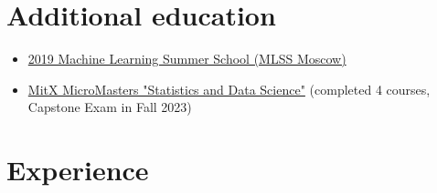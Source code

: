 \documentclass[unicode,a4paper,10pt]{article}
\begin{document}
\section{Additional education}
\begin{itemize}
	\item \href{https://smiles.skoltech.ru/mlss2019}{2019 Machine Learning Summer School (MLSS Moscow)}
	\item \href{https://courses.edx.org/dashboard/programs/fa06b9c5-fe2b-41d8-a8c1-1bfd9c0d7b07/}{MitX MicroMasters "Statistics and Data Science"} (completed 4 courses, Capstone Exam in Fall 2023)
\end{itemize}
\section{Experience}
\end{document}
